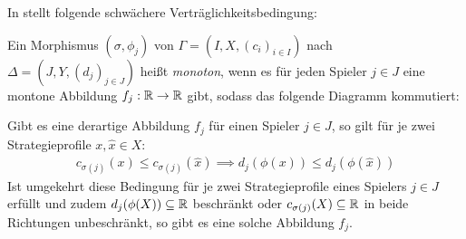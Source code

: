 In \cite{LapGameCat} stellt \citeauthor{LapGameCat} folgende schwächere Verträglichkeitsbedingung:

\begin{defn}
	Ein Morphismus $(\sigma, \phi_j)$ von $\Gamma = (I, X, (c_i)_{i\in I})$ nach $\Delta = (J, Y, (d_j)_{j\in J})$ heißt \emph{monoton}, wenn es für jeden Spieler $j \in J$ eine montone Abbildung $f_j: \mathbb{R} \to \mathbb{R}$ gibt, sodass das folgende Diagramm kommutiert:	
	\begin{center}
	\end{center}
\end{defn}

\begin{bem}
	Gibt es eine derartige Abbildung $f_j$ für einen Spieler $j \in J$, so gilt für je zwei Strategieprofile $x, \hat{x} \in X$:
		\begin{align}\label{eq:CharExMonMor}
			c_{\sigma(j)}(x) \leq c_{\sigma(j)}(\hat{x}) \implies d_j(\phi(x)) \leq d_j(\phi(\hat{x}))
		\end{align}
	Ist umgekehrt diese Bedingung für je zwei Strategieprofile eines Spielers $j \in J$ erfüllt und zudem $d_j(\phi(X)) \subseteq \mathbb{R}$ beschränkt oder $c_{\sigma(j)}(X) \subseteq \mathbb{R}$ in beide Richtungen unbeschränkt, so gibt es eine solche Abbildung $f_j$.
\end{bem}

